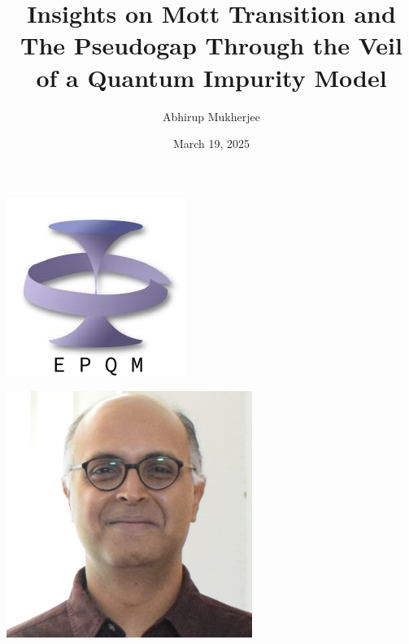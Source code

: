 \documentclass[10pt,aspectratio=169]{beamer}
\title{Insights on Mott Transition and The Pseudogap Through the Veil of a Quantum Impurity Model}
\author{\alert{Abhirup Mukherjee}}
\date{March 19, 2025}
\institute{DPS Day '25 \\ Department of Physical Sciences, IISER Kolkata}
\begin{document}
\centering

\begin{frame}
\maketitle
\end{frame}

\begin{frame}{}
\hspace*{\fill}
\begin{minipage}{0.1\textwidth}
	\includegraphics[width=\textwidth]{epqm_logo_mod.jpeg}
\end{minipage}
\begin{minipage}{0.25\textwidth}
	\centering
	\includegraphics[width=0.6\textwidth]{slal.jpg}\\

\end{minipage}
\end{frame}
\end{document}
